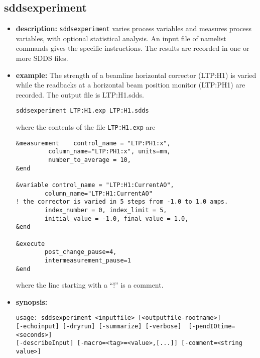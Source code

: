 %
%
\begin{latexonly}
\newpage
\end{latexonly}

%
%
\subsection{sddsexperiment}
\label{sddsexperiment}

\begin{itemize}
\item {\bf description:}
%
%
\verb+sddsexperiment+ varies process variables and measures process variables, with optional statistical analysis.
An input file of namelist commands gives the specific instructions. 
The results are recorded in one or more SDDS files.
\item {\bf example:} 
%
% 
%
The strength of a beamline horizontal corrector (LTP:H1) is varied while the readbacks at a horizontal beam position
monitor (LTP:PH1) are recorded. The output file is LTP:H1.sdds.
\begin{verbatim}
sddsexperiment LTP:H1.exp LTP:H1.sdds
\end{verbatim}
where the contents of the file \verb+LTP:H1.exp+ are
\begin{verbatim}
&measurement    control_name = "LTP:PH1:x",
         column_name="LTP:PH1:x", units=mm,
         number_to_average = 10,
&end

&variable control_name = "LTP:H1:CurrentAO",
        column_name="LTP:H1:CurrentAO"
! the corrector is varied in 5 steps from -1.0 to 1.0 amps.
        index_number = 0, index_limit = 5,
        initial_value = -1.0, final_value = 1.0,
&end
        
&execute
        post_change_pause=4,
        intermeasurement_pause=1
&end
\end{verbatim}

where the line starting with a ``!'' is a comment.
\item {\bf synopsis:} 
%
%
\begin{verbatim}
usage: sddsexperiment <inputfile> [<outputfile-rootname>]
[-echoinput] [-dryrun] [-summarize] [-verbose]  [-pendIOtime=<seconds>] 
[-describeInput] [-macro=<tag>=<value>,[...]] [-comment=<string value>]
\end{verbatim}


\end{itemize}
